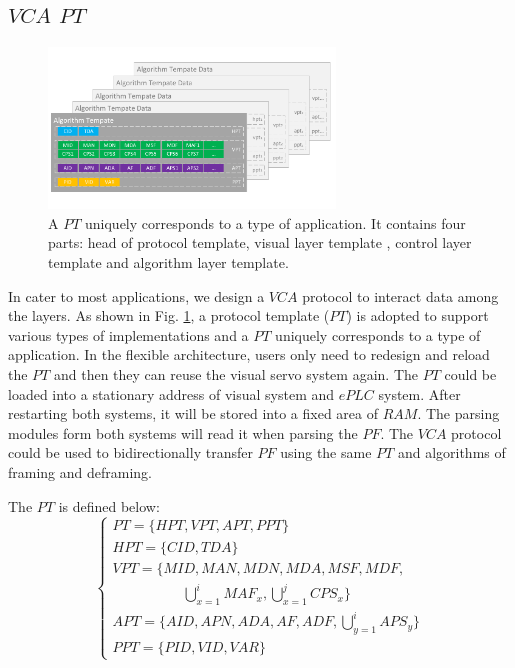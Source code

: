 \documentclass[journal,UTF8]{IEEEtran}
\begin{document}
\subsection{$VCA$ $PT$}
\begin{figure}
\centering
\includegraphics[width=3in]{fig/PT.pdf}
\caption{A $PT$ uniquely corresponds to a type of application. It contains four parts: head of protocol template, visual layer template , control layer template and algorithm layer template.}
\label{fig:PT}
\end{figure}
In cater to most applications, we design a $VCA$ protocol to interact data among the layers. As shown in Fig. \ref{fig:PT}, a protocol template ($PT$) is adopted to support various types of implementations and a $PT$ uniquely corresponds to a type of application. In the flexible architecture, users only need to redesign and reload the $PT$ and then they can reuse the visual servo system again. The $PT$ could be loaded into a stationary address of visual system and $ePLC$ system. After restarting both systems, it will be stored into a fixed area of $RAM$. The parsing modules form both systems will read it when parsing the $PF$. The $VCA$ protocol could be used to bidirectionally transfer $PF$ using the same $PT$ and algorithms of framing and deframing.  
 
 The $PT$ is defined below:
  \begin{equation}
 \left\{
 \begin{array}{l}
 PT = \{HPT, VPT, APT, PPT\}\\
 HPT = \{CID, TDA\}\\
 VPT = \{MID, MAN, MDN, MDA, MSF, MDF, \\
 \qquad\qquad\quad \bigcup_{x=1}^i MAF_x, \bigcup_{x=1}^j CPS_x\}\\
 APT = \{AID, APN, ADA, AF, ADF, \bigcup_{y=1}^i APS_y\}\\
 PPT = \{PID, VID, VAR\}
 \end{array}
 \right.
 \end{equation}
 
\end{document}
